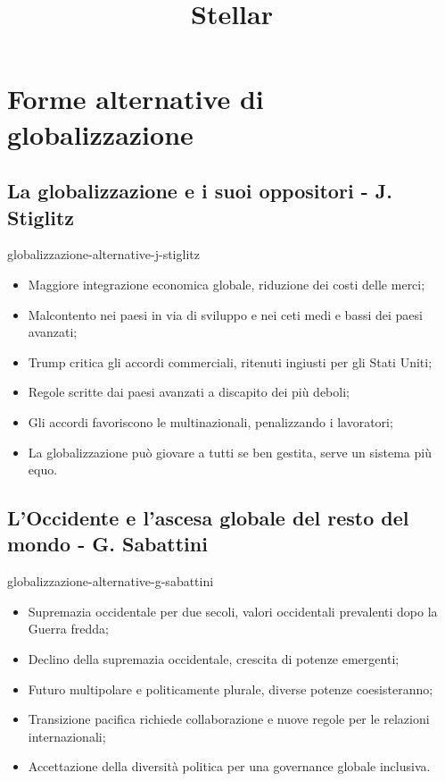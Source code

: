 \documentclass[preview]{standalone}
\begin{document}
\title{Stellar}
\genpage


\section{Forme alternative di globalizzazione}

\subsection{La globalizzazione e i suoi oppositori - J. Stiglitz}

\begin{snippet}{globalizzazione-alternative-j-stiglitz}
    \vspace{-0.25cm}
    \begin{itemize}
        \item Maggiore integrazione economica globale, riduzione dei costi delle merci;
        \item Malcontento nei paesi in via di sviluppo e nei ceti medi e bassi dei paesi avanzati;
        \item Trump critica gli accordi commerciali, ritenuti ingiusti per gli Stati Uniti;
        \item Regole scritte dai paesi avanzati a discapito dei più deboli;
        \item Gli accordi favoriscono le multinazionali, penalizzando i lavoratori;
        \item La globalizzazione può giovare a tutti se ben gestita, serve un sistema più equo.
    \end{itemize}
\end{snippet}

\subsection{L'Occidente e l'ascesa globale del resto del mondo - G. Sabattini}

\begin{snippet}{globalizzazione-alternative-g-sabattini}
    \vspace{-0.25cm}
    \begin{itemize}
        \item Supremazia occidentale per due secoli, valori occidentali prevalenti dopo la Guerra
            fredda;
        \item Declino della supremazia occidentale, crescita di potenze emergenti;
        \item Futuro multipolare e politicamente plurale, diverse potenze coesisteranno;
        \item Transizione pacifica richiede collaborazione e nuove regole per le relazioni
            internazionali;
        \item Accettazione della diversità politica per una governance globale inclusiva.
    \end{itemize}
\end{snippet}
\end{document}
